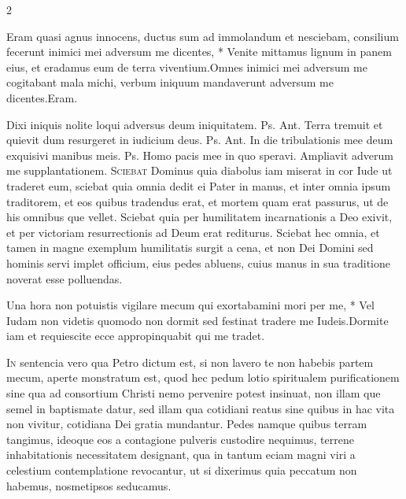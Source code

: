 \begin{multicols*}{2}
\begin{responsory}
{Eram quasi agnus innocens, ductus sum ad immolandum et nesciebam, consilium fecerunt inimici mei adversum me dicentes, * Venite mittamus lignum in panem eius, et eradamus eum de terra viventium.}{Omnes inimici mei adversum me cogitabant mala michi, verbum iniquum mandaverunt adversum me dicentes.}Eram.
\end{responsory}%
 Dixi iniquis nolite loqui adversus deum iniquitatem. {\color{Red} Ps.}  {\color{Red} Ant.} Terra tremuit et quievit dum resurgeret in iudicium deus. {\color{Red} Ps.}  {\color{Red} Ant.} In die tribulationis mee deum exquisivi manibus meis. {\color{Red} Ps.}  \V Homo pacis mee in quo speravi. \R Ampliavit adverum me supplantationem.
\lettrine[lines=2]{\zallmancaps \color{Blue} S}{ciebat} Dominus quia diabolus iam miserat in cor Iude ut traderet eum, sciebat quia omnia dedit ei Pater in manus, et inter omnia ipsum traditorem, et eos quibus tradendus erat, et mortem quam erat passurus, ut de his omnibus que vellet. Sciebat quia per humilitatem incarnationis a Deo exivit, et per victoriam resurrectionis ad Deum erat rediturus. Sciebat hec omnia, et tamen in magne exemplum humilitatis surgit a cena, et non Dei Domini sed hominis servi implet officium, eius pedes abluens, cuius manus in sua traditione noverat esse polluendas.
\begin{responsory}
{Una hora non potuistis vigilare mecum qui exortabamini mori per me, * Vel Iudam non videtis quomodo non dormit sed festinat tradere me Iudeis.}{Dormite iam et requiescite ecce appropinquabit qui me tradet.}
\end{responsory}%
\lettrine[lines=2]{\zallmancaps \color{Red} I}{n} sentencia vero qua Petro dictum est, si non lavero te non habebis partem mecum, aperte monstratum est, quod hec pedum lotio spiritualem purificationem sine qua ad consortium Christi nemo pervenire potest insinuat, non illam que semel in baptismate datur, sed illam qua cotidiani reatus sine quibus in hac vita non vivitur, cotidiana Dei gratia mundantur. Pedes namque quibus terram tangimus, ideoque eos a contagione pulveris custodire nequimus, terrene inhabitationis necessitatem designant, qua in tantum eciam magni viri a celestium contemplatione revocantur, ut si dixerimus quia peccatum non habemus, nosmetipsos seducamus.

\end{multicols*}
